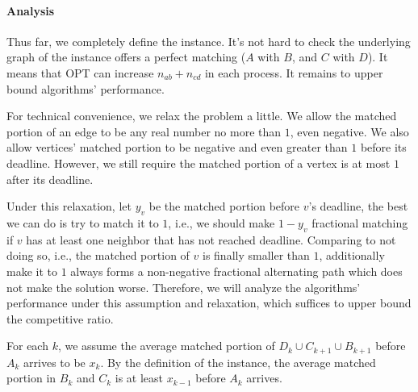 

\paragraph{Analysis}

Thus far, we completely define the instance. It's not hard to check the underlying graph of the instance offers a perfect matching ($A$ with $B$, and $C$ with $D$). It means that OPT can increase $n_{ab} + n_{cd}$ in each process. It remains to upper bound algorithms' performance. 

For technical convenience, we relax the problem a little. We allow the matched portion of an edge to be any real number no more than $1$, even negative. We also allow vertices' matched portion to be negative and even greater than $1$ before its deadline. However, we still require the matched portion of a vertex is at most $1$ after its deadline. 

Under this relaxation, let $y_v$ be the matched portion before $v$'s deadline, the best we can do is try to match it to $1$, i.e., we should make $1-y_v$ fractional matching if $v$ has at least one neighbor that has not reached deadline. Comparing to not doing so, i.e., the matched portion of $v$ is finally smaller than $1$, additionally make it to $1$ always forms a non-negative fractional alternating path which does not make the solution worse. Therefore, we will analyze the algorithms' performance under this assumption and relaxation, which suffices to upper bound the competitive ratio. 

For each $k$, we assume the average matched portion of $D_{k} \cup C_{k+1} \cup B_{k+1}$ before $A_{k}$ arrives to be $x_{k}$. By the definition of the instance, the average matched portion in $B_k$ and $C_k$ is at least $x_{k-1}$ before $A_k$ arrives. 

